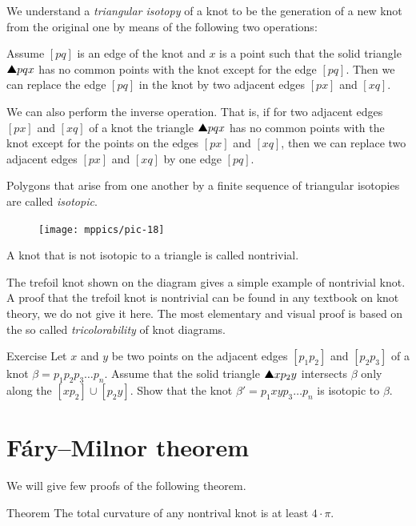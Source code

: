 We understand a \emph{triangular isotopy} of a knot to be the generation of a new knot from the original one by means of the
following two operations:

Assume $[pq]$ is an edge of the knot and $x$
is a point such that the solid triangle $\solidtriangle pqx$  has no common points with the knot except for the edge $[pq]$.
Then we can replace the edge $[pq]$ in the knot by two adjacent edges $[px]$ and $[xq]$.

We can also perform the inverse operation.
That is, if for two adjacent edges $[px]$ and $[xq]$ of a knot the triangle
$\solidtriangle pqx$ has no common points with the knot except for the points on the edges $[px]$ and $[xq]$,
then we can replace two adjacent edges $[px]$ and $[xq]$ by one edge $[pq]$.

Polygons that arise from one another by a finite sequence of
triangular isotopies are called \emph{isotopic}.

\begin{figure}
\vskip-0mm
\centering
\texttt{[image: mppics/pic-18]}
\vskip0mm
\end{figure}

A knot that is not isotopic to a triangle is called nontrivial.

The trefoil knot shown on the diagram gives a simple example of nontrivial knot.
A proof that the trefoil knot is nontrivial can be found in any textbook on knot theory, we do not give it here.
The most elementary and visual proof is based on the so called \emph{tricolorability} of knot diagrams.   

\begin{thm}{Exercise}\label{ex:triangle-isotopy}
Let $x$ and $y$ be two points on the adjacent edges $[p_1p_2]$ and $[p_2p_3]$ of a knot $\beta=p_1p_2p_3\dots p_n$.
Assume that the solid triangle $\solidtriangle xp_2y$ intersects $\beta$ only along the $[xp_2]\cup [p_2y]$.
Show that the knot $\beta'=p_1xyp_3\dots p_n$ is isotopic to $\beta$.
\end{thm}



\section{F\'ary--Milnor theorem}

We will give few proofs of the following theorem.

\begin{thm}{Theorem}\label{thm:fary-milnor}
The total curvature of any nontrival knot is at least $4\cdot\pi$. 
\end{thm}


